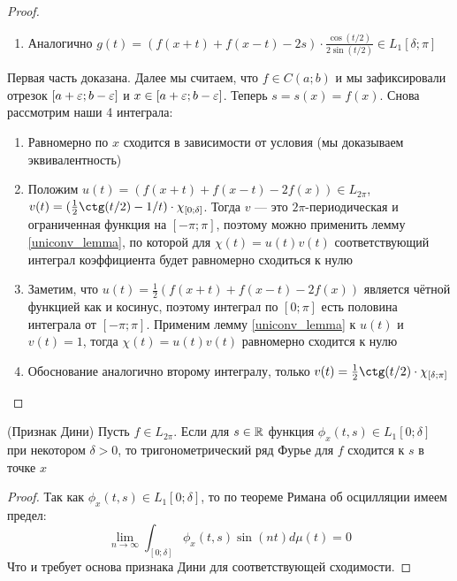 \begin{proof}
\begin{enumerate}
 		\item Аналогично $g(t) = (f(x + t) + f(x - t) - 2s) \cdot \frac{\cos(t / 2)}{2\sin(t / 2)} \in L_1[\delta; \pi]$
 	\end{enumerate}
    Первая часть доказана. Далее мы считаем, что $f \in C(a; b)$ и мы зафиксировали отрезок $[a + \varepsilon; b - \varepsilon]$ и $x \in [a + \varepsilon; b - \varepsilon]$. Теперь $s = s(x) = f(x)$. Снова рассмотрим наши 4 интеграла:
    
    \begin{enumerate}
    	\item Равномерно по $x$ сходится в зависимости от условия (мы доказываем эквивалентность)
    	
    	\item Положим $u(t) = (f(x + t) + f(x - t) - 2f(x)) \in L_{2\pi}$, $v(t) = (\frac{1}{2}\ctg(t / 2) - 1 / t) \cdot \chi_{[0; \delta]}$. Тогда $v$ --- это $2\pi$-периодическая и ограниченная функция на $[-\pi; \pi]$, поэтому можно применить лемму \ref{uniconv_lemma}, по которой для $\chi(t) = u(t)v(t)$ соответствующий интеграл коэффициента будет равномерно сходиться к нулю
    	
    	\item Заметим, что $u(t) = \frac{1}{2}(f(x + t) + f(x - t) - 2f(x))$ является чётной функцией как и косинус, поэтому интеграл по $[0; \pi]$ есть половина интеграла от $[-\pi; \pi]$. Применим лемму \ref{uniconv_lemma} к $u(t)$ и $v(t) = 1$, тогда $\chi(t) = u(t)v(t)$ равномерно сходится к нулю
    	
    	\item Обоснование аналогично второму интегралу, только $v(t) = \frac{1}{2}\ctg(t / 2) \cdot \chi_{[\delta; \pi]}$
    \end{enumerate}
\end{proof}

\begin{theorem} (Признак Дини)
	Пусть $f \in L_{2\pi}$. Если для $s \in \mathbb{R}$ функция $\phi_x(t, s) \in L_1[0; \delta]$ при некотором $\delta > 0$, то тригонометрический ряд Фурье для $f$ сходится к $s$ в точке $x$
\end{theorem}

\begin{proof}
	Так как $\phi_x(t, s) \in L_1[0; \delta]$, то по теореме Римана об осцилляции имеем предел:
	\[
		\lim_{n \to \infty} \int_{[0; \delta]} \phi_x(t, s)\sin(nt)d\mu(t) = 0
	\]
	Что и требует основа признака Дини для соответствующей сходимости.
\end{proof}